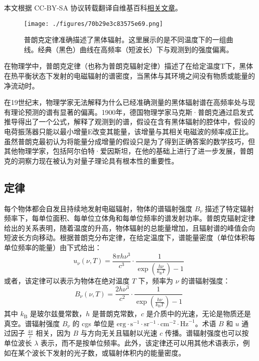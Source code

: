 
本文根据 CC-BY-SA 协议转载翻译自维基百科\href{https://en.wikipedia.org/wiki/Planck\%27s_law}{相关文章}。

\begin{figure}[ht]
\centering
\texttt{[image: ./figures/70b29e3c83575e69.png]}
\caption{普朗克定律准确描述了黑体辐射。这里展示的是不同温度下的一组曲线。经典（黑色）曲线在高频率（短波长）下与观测到的强度偏离。} \label{fig_HTFS_1}
\end{figure}
在物理学中，普朗克定律（也称为普朗克辐射定律）描述了在给定温度T下，黑体在热平衡状态下发射的电磁辐射的谱密度，当黑体与其环境之间没有物质或能量的净流动时。

在19世纪末，物理学家无法解释为什么已经准确测量的黑体辐射谱在高频率处与现有理论预测的谱有显著的偏离。1900年，德国物理学家马克斯·普朗克通过启发式推导得出了一个公式，解释了观测到的谱，假设在含有黑体辐射的腔体中，假设的电荷振荡器只能以最小增量E改变其能量，该增量与其相关电磁波的频率成正比。虽然普朗克最初认为将能量分成增量的假设只是为了得到正确答案的数学技巧，但其他物理学家，包括阿尔伯特·爱因斯坦，在他的基础上进行了进一步发展，普朗克的洞察力现在被认为对量子理论具有根本性的重要性。
\subsection{定律}
每个物体都会自发且持续地发射电磁辐射，物体的谱辐射强度 \( B_\nu \) 描述了特定辐射频率下，每单位面积、每单位立体角和每单位频率的谱发射功率。普朗克辐射定律给出的关系表明，随着温度的升高，物体辐射的总能量增加，且辐射谱的峰值会向短波长方向移动。根据普朗克分布定律，在给定温度下，谱能量密度（单位体积每单位频率的能量）由下式给出：
\[
u_\nu(\nu, T) = \frac{8 \pi h \nu^3}{c^3} \cdot \frac{1}{\exp \left( \frac{h \nu}{k_{\mathrm{B}} T} \right) - 1}~
\]
或者，该定律可以表示为物体在绝对温度 \( T \) 下，频率为 \( \nu \) 的谱辐射强度：
\[
B_\nu(\nu, T) = \frac{2 h \nu^3}{c^2} \cdot \frac{1}{\exp \left( \frac{h \nu}{k_{\mathrm{B}} T} \right) - 1}~
\]
其中 \( k_{\mathrm{B}} \) 是玻尔兹曼常数，\( h \) 是普朗克常数，\( c \) 是介质中的光速，无论是物质还是真空。谱辐射强度 \( B_\nu \) 的 cgs 单位是 \( \text{erg} \cdot \text{s}^{-1} \cdot \text{sr}^{-1} \cdot \text{cm}^{-2} \cdot \text{Hz}^{-1} \)。术语 \( B \) 和 \( u \) 通过因子 \( \frac{4 \pi}{c} \) 相关，因为 \( B \) 与方向无关且辐射以光速 \( c \) 传播。谱辐射强度也可以按单位波长 \( \lambda \) 表示，而不是按单位频率。此外，该定律还可以用其他术语表示，例如在某个波长下发射的光子数，或辐射体积内的能量密度。

